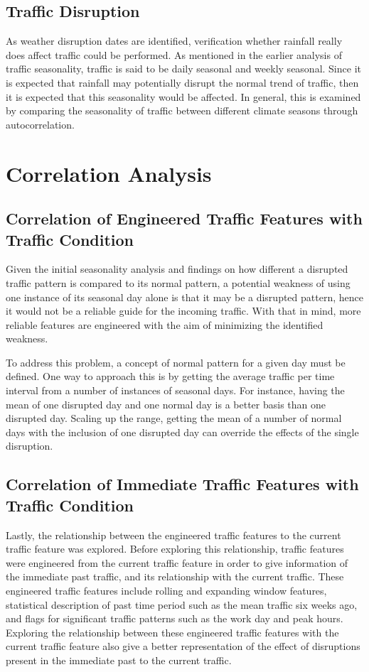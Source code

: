 \subsection{Traffic Disruption}
As weather disruption dates are identified, verification whether rainfall really does affect traffic could be performed. As mentioned in the earlier analysis of traffic seasonality, traffic is said to be daily seasonal and weekly seasonal. Since it is expected that rainfall may potentially disrupt the normal trend of traffic, then it is expected that this seasonality would be affected. In general, this is examined by comparing the seasonality of traffic between different climate seasons through autocorrelation. 

\section{Correlation Analysis}
\subsection{Correlation of Engineered Traffic Features with Traffic Condition}

Given the initial seasonality analysis and findings on how different a disrupted traffic pattern is compared to its normal pattern, a potential weakness of using one instance of its seasonal day alone is that it may be a disrupted pattern, hence it would not be a reliable guide for the incoming traffic. With that in mind, more reliable features are engineered with the aim of minimizing the identified weakness.

To address this problem, a concept of normal pattern for a given day must be defined. One way to approach this is by getting the average traffic per time interval from a number of instances of seasonal days. For instance, having the mean of one disrupted day and one normal day is a better basis than one disrupted day. Scaling up the range, getting the mean of a number of normal days with the inclusion of one disrupted day can override the effects of the single disruption.


\subsection{Correlation of Immediate Traffic Features with Traffic Condition}
Lastly, the relationship between the engineered traffic features to the current traffic feature was explored. Before exploring this relationship, traffic features were engineered from the current traffic feature in order to give information of the immediate past traffic, and its relationship with the current traffic. These engineered traffic features include rolling and expanding window features, statistical description of past time period such as the mean traffic six weeks ago, and flags for significant traffic patterns such as the work day and peak hours. Exploring the relationship between these engineered traffic features with the current traffic feature also give a better representation of the effect of disruptions present in the immediate past to the current traffic.

